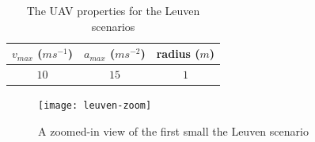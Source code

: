 \begin{table}[h]
\centering
\begin{tabular}{ c | c | c }
$v_{max}$ ($ms^{-1}$)	& $a_{max}$ ($ms^{-2}$) 	& radius ($m$) 	 \\
\hline
$10$ & $15$ 	& $1$ \\
\end{tabular}
\caption{The UAV properties for the Leuven scenarios}
\label{table:uav-leuven}
\end{table}

\begin{figure}[h]
	\centering
	\texttt{[image: leuven-zoom]}
	\caption{A zoomed-in view of the first small the Leuven scenario}
	\label{fig:sf-zoom}
\end{figure}



\begin{figure}
	\centering
	

\end{figure}
